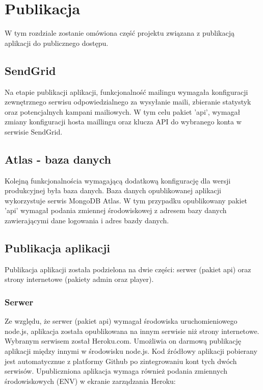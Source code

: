 \chapter{Publikacja}
\label{ch:funplenop}

W tym rozdziale zostanie omówiona część projektu związana z publikacją aplikacji do publicznego dostępu.

\label{publication:sendgrid}
\section{SendGrid}
Na etapie publikacji aplikacji, funkcjonalność mailingu wymagała konfiguracji zewnętrznego serwisu odpowiedzialnego za wysyłanie maili, zbieranie statystyk oraz potencjalnych kampani mailiowych. W tym celu pakiet 'api', wymagał zmiany konfiguracji hosta maillingu oraz klucza API do wybranego konta w serwisie SendGrid.

\section{Atlas - baza danych}
Kolejną funkcjonalnościa wymagającą dodatkową konfigurację dla wersji produkcyjnej była baza danych. Baza danych opublikowanej aplikacji wykorzystuje serwis MongoDB Atlas. W tym przypadku opublikowany pakiet 'api' wymagał podania zmiennej środowiskowej z adresem bazy danych zawierającymi dane logowania i adres bazdy danych.

\section{Publikacja aplikacji}
Publikacja aplikacji została podzielona na dwie części: serwer (pakiet api) oraz strony internetowe (pakiety admin oraz player).

\subsection{Serwer}
Ze względu, że serwer (pakiet api) wymagał środowiska uruchomieniowego node.js, aplikacja została opublikowana na innym serwisie niż strony internetowe. Wybranym serwisem został Heroku.com. Umożliwia on darmową publikację aplikacji między innymi w środowisku node.js. Kod źródłowy aplikacji pobierany jest automatycznue z platformy Github po zintegrowaniu kont tych dwóch serwisów. Upubliczniona aplikacja wymaga również podania zmiennych środowiskowych (ENV) w ekranie zarządzania Heroku:

